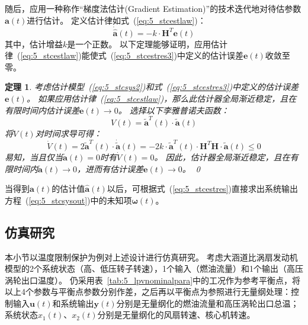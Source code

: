 \documentclass{article}
\newtheorem{theorem}{定理}
\begin{document}
随后，应用一种称作“梯度法估计(Gradient Estimation)”的技术\cite{Slotine2005Applied,Anderson1977Exponential,Morgan1977uniform}迭代地对待估参数$\bm{a}(t)$进行估计。
定义估计律如式~(\ref{eq:5_stcestlaw})：
\begin{equation}
    \bm{\dot {\hat a}}(t)= -k \cdot \mathbf{H}^{T}\bm{e}(t)
\label{eq:5_stcestlaw}
\end{equation}
其中，估计增益$k$是一个正数。
以下定理能够证明，应用估计律~(\ref{eq:5_stcestlaw})能使式~(\ref{eq:5_stcestres3})中定义的估计误差$\bm{e}(t)$收敛至零。

\begin{theorem}
\label{thm:5_theorem_stcestonline}
\cite{Slotine2005Applied}
考虑估计模型~(\ref{eq:5_stcsys2})和式~(\ref{eq:5_stcestres3})中定义的估计误差$\bm{e}(t)$。
如果应用估计律~(\ref{eq:5_stcestlaw})，那么此估计器全局渐近稳定，且在有限时间内估计误差$\bm{e}(t)\rightarrow 0$。
\proof
选择以下李雅普诺夫函数：
\begin{equation}
    V(t) = \bm{\tilde{a}}^T(t)\cdot \bm{\tilde{a}}(t)
\label{eq:5_stcthm1}
\end{equation}
将$V(t)$对时间求导可得：
\begin{equation}
    \dot{V}(t) = 2\bm{\tilde{a}}^T(t)\cdot \bm{\dot{\tilde{a}}}(t)=-2k\cdot\bm{\tilde{a}}^T(t)\cdot \mathbf{H}^T\mathbf{H} \cdot \bm{\tilde{a}}(t) \leq 0
\label{eq:5_stcthm2}
\end{equation}
易知，当且仅当$\bm{\tilde{a}}(t)=0$时有$\dot{V}(t)=0$。
因此，估计器全局渐近稳定，且在有限时间内$\bm{\tilde{a}}(t)\rightarrow 0$，进而有估计误差$\bm{e}(t)\rightarrow 0$。
\qed
\end{theorem}

当得到$\bm{a}(t)$的估计值$\bm{\hat{a}}(t)$以后，可根据式~(\ref{eq:5_stcestres})直接求出系统输出方程~(\ref{eq:5_stcsysout})中的未知项$\bm{\omega}(t)$。

\subsection{仿真研究}

本小节以温度限制保护为例对上述设计进行仿真研究。
考虑大涵道比涡扇发动机模型的2个系统状态（高、低压转子转速），1个输入（燃油流量）和1个输出（高压涡轮出口温度）。
仍采用表~\ref{tab:5_lpvnominalpara}中的工况作为参考平衡点，将以上4个参数与平衡点参数分别作差，之后再以平衡点为参照进行无量纲处理：控制输入$\bm{u}(t)$和系统输出$\bm{y}(t)$分别是无量纲化的燃油流量和高压涡轮出口总温；系统状态$x_1(t)$、$x_2(t)$分别是无量纲化的风扇转速、核心机转速。
\end{document}
